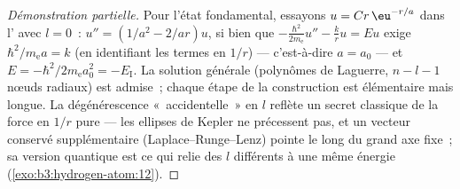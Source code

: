 \begin{proof}[Démonstration partielle]
Pour l'état fondamental, essayons $u = Cr\,\eu^{-r/a}$ dans l' avec $l = 0$~: $u'' = (1/a^2 - 2/ar)u$, si bien que
$-\tfrac{\hbar^2}{2m_{\text{e}}}u'' - \tfrac kr u = Eu$ exige
$\hbar^2/m_{\text{e}}a = k$ (en identifiant les termes en $1/r$) ---
c'est-à-dire $a = a_0$ --- et $E = -\hbar^2/2m_{\text{e}}a_0^2 = -E_{\text{I}}$.
La solution générale (polynômes de Laguerre, $n - l - 1$ nœuds
radiaux) est admise~; chaque étape de la construction est élémentaire
mais longue. La dégénérescence «~accidentelle~» en $l$ reflète un
secret classique de la force en $1/r$ pure --- les ellipses de Kepler
ne précessent pas, et un vecteur conservé supplémentaire
(Laplace--Runge--Lenz) pointe le long du grand axe fixe~; sa version
quantique est ce qui relie des $l$ différents à une même énergie
(\cref{exo:b3:hydrogen-atom:12}).
\end{proof}

